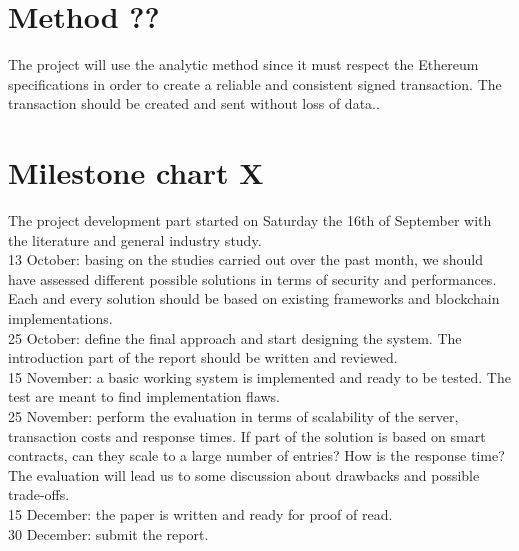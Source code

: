 \documentclass[paper=a4, fontsize=11pt]{scrartcl} %
\numberwithin{equation}{section} %
\numberwithin{figure}{section} %
\numberwithin{table}{section} %
\begin{document}
\section{Method ??}

The project will use the analytic method since it must respect the Ethereum specifications in order to create a reliable and consistent signed transaction. The transaction should be created and sent without loss of data..

\section{Milestone chart X}

The project development part started on Saturday the 16th of September with the literature and general industry study. \\

13 October: basing on the studies carried out over the past month, we should have assessed different possible solutions in terms of security and performances. Each and every solution should be based on existing frameworks and blockchain implementations. \\

25 October: define the final approach and start designing the system. The introduction part of the report should be written and reviewed. \\

15 November: a basic working system is implemented and ready to be tested. The test are meant to find implementation flaws. \\

25 November: perform the evaluation in terms of scalability of the server, transaction costs and response times. If part of the solution is based on smart contracts, can they scale to a large number of entries? How is the response time? The evaluation will lead us to some discussion about drawbacks and possible trade-offs. \\

15 December: the paper is written and ready for proof of read. \\

30 December: submit the report. \\

\printbibliography
%
\end{document}
